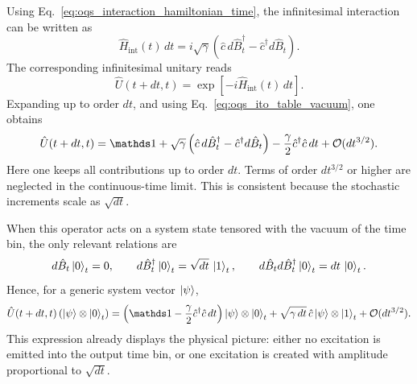 Using Eq.~\eqref{eq:oqs_interaction_hamiltonian_time}, the infinitesimal interaction can be written as
\begin{equation}
	\hat H_{\mathrm{int}}(t)\,dt
	=
	i\sqrt{\gamma}
	\left(
	\hat c\, d\hat B_t^\dagger - \hat c^\dagger d\hat B_t
	\right).
	\label{eq:oqs_infinitesimal_interaction}
\end{equation}
The corresponding infinitesimal unitary reads
\begin{equation}
	\hat U(t+dt,t)
	=
	\exp\!\left[-i\hat H_{\mathrm{int}}(t)\,dt\right].
	\label{eq:oqs_infinitesimal_unitary_exact}
\end{equation}
Expanding up to order $dt$, and using Eq.~\eqref{eq:oqs_ito_table_vacuum}, one obtains
\begin{equation}
	\hat U(t+dt,t)
	=
	\id
	+
	\sqrt{\gamma}
	\left(
	\hat c\, d\hat B_t^\dagger - \hat c^\dagger d\hat B_t
	\right)
	-
	\frac{\gamma}{2}\hat c^\dagger \hat c\, dt
	+
	\mathcal{O}(dt^{3/2}).
	\label{eq:oqs_infinitesimal_unitary_expanded}
\end{equation}
Here one keeps all contributions up to order $dt$. Terms of order $dt^{3/2}$ or higher are neglected in the continuous-time limit. This is consistent because the stochastic increments scale as $\sqrt{dt}$.

When this operator acts on a system state tensored with the vacuum of the time bin, the only relevant relations are
\begin{equation}
	d\hat B_t \ket{0}_t = 0,
	\qquad
	d\hat B_t^\dagger \ket{0}_t = \sqrt{dt}\,\ket{1}_t,
	\qquad
	d\hat B_t d\hat B_t^\dagger \ket{0}_t = dt\,\ket{0}_t.
	\label{eq:oqs_action_on_vacuum}
\end{equation}
Hence, for a generic system vector $\ket{\psi}$,
\begin{equation}
	\hat U(t+dt,t)\left(\ket{\psi}\otimes\ket{0}_t\right)
	=
	\left(
	\id-\frac{\gamma}{2}\hat c^\dagger \hat c\,dt
	\right)\ket{\psi}\otimes\ket{0}_t
	+
	\sqrt{\gamma\,dt}\,\hat c\ket{\psi}\otimes\ket{1}_t
	+
	\mathcal{O}(dt^{3/2}).
	\label{eq:oqs_unitary_action_vacuum}
\end{equation}
This expression already displays the physical picture: either no excitation is emitted into the output time bin, or one excitation is created with amplitude proportional to $\sqrt{dt}$.

